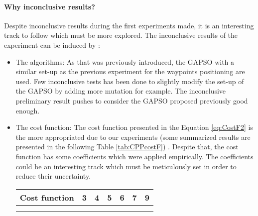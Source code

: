	\paragraph*{Why inconclusive results?} \label{sec:inconclusiveResults}
			  
		
		Despite inconclusive results during the first experiments made, it is an interesting track to follow  which must  be more explored.  
		The inconclusive results of the experiment can be induced by : %
		\begin{itemize}
		\item The algorithms: As that was previously introduced, the GAPSO  with a similar set-up as the previous experiment for the waypoints positioning %
		 are used. Few inconclusive tests has been done to slightly modify the set-up of the GAPSO by adding more mutation for example. The inconclusive preliminary result pushes to consider the GAPSO proposed previously good enough.
		\item The cost function: The cost function presented in the Equation \ref{eq:CostF2} is the more appropriated due to our experiments (some summarized results are presented in the following Table \ref{tab:CPPcostF}) . Despite that, the cost function has some coefficients which were applied empirically. The coefficients could be an interesting track which must be meticulously set in order to reduce their uncertainty. 
		\begin{tabular}{l|p{1.3cm}p{1.3cm}p{1.3cm}p{1.3cm}p{1.3cm}p{1.3cm}}\label{tab:CPPcostF}
\textbf {Cost function} &\textbf {3}  &\textbf{4  }       & \textbf{5  } &\textbf{6  }&\textbf{7  }&\textbf{9  }\\ \hline
\cellcolor[HTML]{F2F2FF}{$\sum_{i=1}^{n}B^{(k,p)}(G') + \frac{400\times\sum_{i=1}^{n}B^{(k,p)}(G')}{(\frac{Distance}{n})\times 2.} /400$}  &  \cellcolor[HTML]{F2F2FF}{56.23\%  458px}       & \cellcolor[HTML]{F2F2FF}{ 60.54\%  652px} & \cellcolor[HTML]{F2F2FF}{65.15\%   817px}& \cellcolor[HTML]{F2F2FF}{ 65.85\%  1114px}& \cellcolor[HTML]{F2F2FF}{ 69.41\%  1077px}& \cellcolor[HTML]{F2F2FF}{ 90.67\%  1396px}\\ \hline
\cellcolor[HTML]{FFFFFF}{$\sum_{i=1}^{n}B^{(k,p)}(G') + \frac{\sum_{i=1}^{n}B^{(k,p)}(G')}{(\frac{Distance}{n})\times 5.}$}  &  \cellcolor[HTML]{FFFFFF}{56.15\%  444px}       & \cellcolor[HTML]{FFFFFF}{ 59.34\%  645px} & \cellcolor[HTML]{FFFFFF}{64.93\%  859px}& \cellcolor[HTML]{FFFFFF}{ 70.14\%  1051px}& \cellcolor[HTML]{FFFFFF}{ 76.59\%  1001px}& \cellcolor[HTML]{FFFFFF}{ 86.77\%  1381px}\\ \hline

\end{tabular}
\end{itemize}
